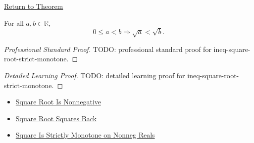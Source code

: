 \newpage
{}
\label{prf:ineq-square-root-strict-monotone}

\begin{remark*}[Return]
\hyperref[thm:ineq-square-root-strict-monotone]{Return to Theorem}
\end{remark*}

\begin{theorem*}
For all $a,b\in\mathbb{R}$,
\[
0\le a<b\Rightarrow \sqrt a<\sqrt b.
\]
\end{theorem*}

\begin{proof}[Professional Standard Proof]
\LRAProofBodyStart
TODO: professional standard proof for ineq-square-root-strict-monotone.
\end{proof}

\begin{proof}[Detailed Learning Proof]
\LRAProofBodyStart
TODO: detailed learning proof for ineq-square-root-strict-monotone.
\end{proof}

\begin{remark*}
\end{remark*}

\begin{dependencies}
\begin{itemize}
  \item \hyperref[thm:sqrt-nonnegative]{Square Root Is Nonnegative}
  \item \hyperref[thm:sqrt-square]{Square Root Squares Back}
  \item \hyperref[thm:ineq-square-monotone]{Square Is Strictly Monotone on Nonneg Reals}
\end{itemize}
\end{dependencies}

\clearpage
